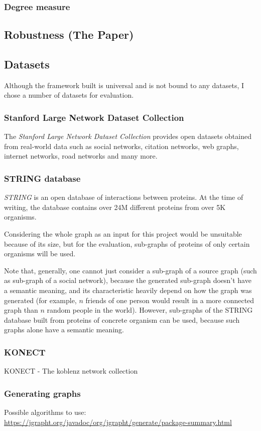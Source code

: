 \subsubsection{Degree measure}

\subsection{Robustness (The Paper)}

\subsection{Datasets}

Although the framework built is universal and is not bound to any datasets, I chose a number of datasets for evaluation.

\subsubsection{Stanford Large Network Dataset Collection}

The \textit{Stanford Large Network Dataset Collection}\cite{Large2016} provides open datasets obtained from real-world data such as social networks, citation networks, web graphs, internet networks, road networks and many more.

\subsubsection{STRING database}

\textit{STRING}\cite{Szklarczyk2019} is an open database of interactions between proteins.
At the time of writing, the database contains over 24M different proteins from over 5K organisms.

Considering the whole graph as an input for this project would be unsuitable because of its size, but for the evaluation, sub-graphs of proteins of only certain organisms will be used.

Note that, generally, one cannot just consider a sub-graph of a source graph (such as sub-graph of a social network), because the generated sub-graph doesn't have a semantic meaning, and its characteristic heavily depend on how the graph was generated (for example, $n$ friends of one person would result in a more connected graph than $n$ random people in the world).
However, sub-graphs of the STRING database built from proteins of concrete organism can be used, because such graphs alone have a semantic meaning.

\subsubsection{KONECT}

KONECT - The koblenz network collection\cite{Kunegis2013}

\subsubsection{Generating graphs}

Possible algorithms to use: \url{https://jgrapht.org/javadoc/org/jgrapht/generate/package-summary.html}



